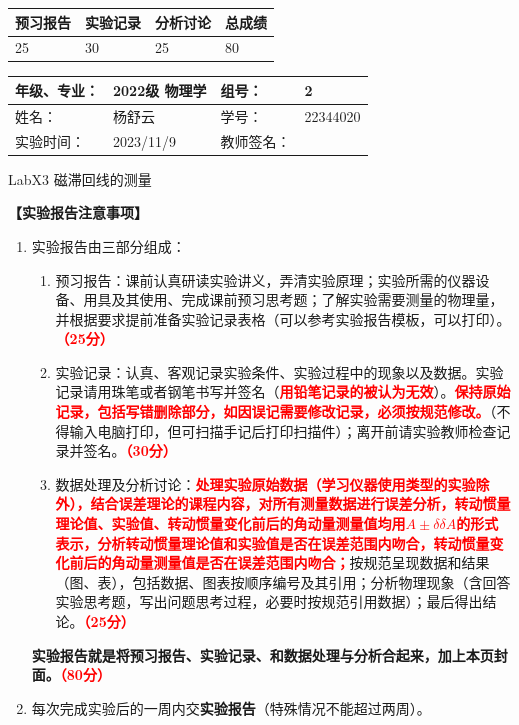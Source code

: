 \documentclass[dvipsnames, svgnames,a4paper,11pt]{article}
\begin{document}
	
	
	
	\begin{table}
		\renewcommand\arraystretch{1.7}
		\begin{tabularx}{\textwidth}{
				|X|X|X|X
				|X|X|X|X|}
			\hline
			\multicolumn{2}{|c|}{预习报告}&\multicolumn{2}{|c|}{实验记录}&\multicolumn{2}{|c|}{分析讨论}&\multicolumn{2}{|c|}{总成绩}\\
			\hline
			\LARGE25 & & \LARGE30 & & \LARGE25 & & \LARGE80 & \\
			\hline
		\end{tabularx}
	\end{table}
	
	\begin{table}
		\renewcommand\arraystretch{1.7}
		\begin{tabularx}{\textwidth}{|X|X|X|X|}
			\hline
			年级、专业： & 2022级 物理学 &组号： & 2\\
			\hline
			姓名： & 杨舒云  & 学号： & 22344020\\
			\hline
			实验时间： & 2023/11/9 & 教师签名： & \\
			\hline
		\end{tabularx}
	\end{table}
	
	\begin{center}
		\LARGE LabX3 \quad 磁滞回线的测量
	\end{center}
	
	\textbf{【实验报告注意事项】}
	\begin{enumerate}
		\item 实验报告由三部分组成：
		\begin{enumerate}
			\item 预习报告：课前认真研读实验讲义，弄清实验原理；实验所需的仪器设备、用具及其使用、完成课前预习思考题；了解实验需要测量的物理量，并根据要求提前准备实验记录表格（可以参考实验报告模板，可以打印）。\textcolor{red}{\textbf{（25分）}}
			\item 实验记录：认真、客观记录实验条件、实验过程中的现象以及数据。实验记录请用珠笔或者钢笔书写并签名（\textcolor{red}{\textbf{用铅笔记录的被认为无效}}）。\textcolor{red}{\textbf{保持原始记录，包括写错删除部分，如因误记需要修改记录，必须按规范修改。}}（不得输入电脑打印，但可扫描手记后打印扫描件）；离开前请实验教师检查记录并签名。\textcolor{red}{\textbf{（30分）}}
			\item 数据处理及分析讨论：\textcolor{red}{\textbf{处理实验原始数据（学习仪器使用类型的实验除外），结合误差理论的课程内容，对所有测量数据进行误差分析，转动惯量理论值、实验值、转动惯量变化前后的角动量测量值均用$A±δ\delta A$的形式表示，分析转动惯量理论值和实验值是否在误差范围内吻合，转动惯量变化前后的角动量测量值是否在误差范围内吻合；}}按规范呈现数据和结果（图、表），包括数据、图表按顺序编号及其引用；分析物理现象（含回答实验思考题，写出问题思考过程，必要时按规范引用数据）；最后得出结论。\textcolor{red}{\textbf{（25分）}}
		\end{enumerate}
		\textbf{实验报告就是将预习报告、实验记录、和数据处理与分析合起来，加上本页封面。\textcolor{red}{（80分）}}
		\item 每次完成实验后的一周内交\textbf{实验报告}（特殊情况不能超过两周）。
	\end{enumerate}
	
\end{document}
